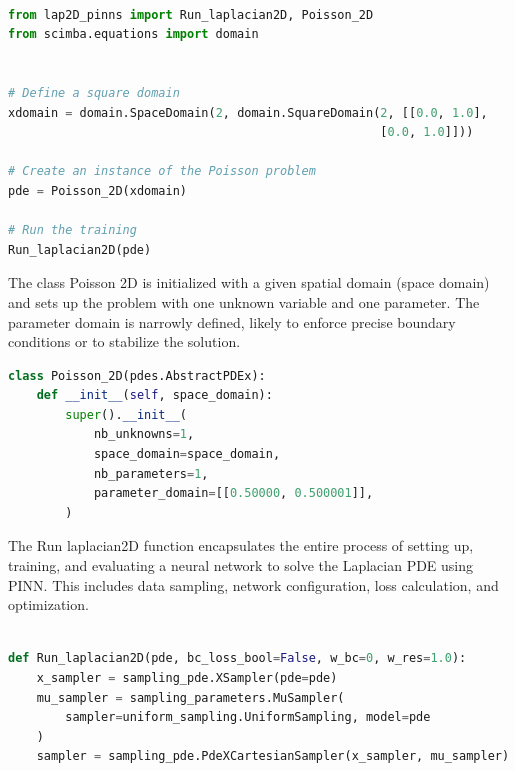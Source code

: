 \documentclass[12pt]{article}
\begin{document}
\begin{enumerate}
\begin{lstlisting}[language=Python,caption={},frame=single, backgroundcolor=\color{gray!10}, basicstyle=\footnotesize,rulecolor=\color{blue}, framexleftmargin=3pt, commentstyle=\color{mygreen}, keywordstyle=\color{blue}]

from lap2D_pinns import Run_laplacian2D, Poisson_2D
from scimba.equations import domain


# Define a square domain
xdomain = domain.SpaceDomain(2, domain.SquareDomain(2, [[0.0, 1.0], 
                                                    [0.0, 1.0]]))

# Create an instance of the Poisson problem
pde = Poisson_2D(xdomain)

# Run the training
Run_laplacian2D(pde)

\end{lstlisting}

The class Poisson 2D is initialized with a given spatial domain (space domain) and sets up the problem with one unknown variable and one parameter.
The parameter domain is narrowly defined, likely to enforce precise boundary conditions or to stabilize the solution.
\begin{lstlisting}[language=Python,caption={},frame=single, backgroundcolor=\color{gray!10}, basicstyle=\footnotesize,rulecolor=\color{blue}, framexleftmargin=3pt, commentstyle=\color{mygreen}, keywordstyle=\color{blue}]
class Poisson_2D(pdes.AbstractPDEx):
    def __init__(self, space_domain):
        super().__init__(
            nb_unknowns=1,
            space_domain=space_domain,
            nb_parameters=1,
            parameter_domain=[[0.50000, 0.500001]],
        )

\end{lstlisting}


The Run laplacian2D function encapsulates the entire process of setting up, training, and evaluating a neural network to solve the Laplacian PDE using PINN. This includes data sampling, network configuration, loss calculation, and optimization.

\begin{lstlisting}[language=Python,caption={},frame=single, backgroundcolor=\color{gray!10}, basicstyle=\footnotesize,rulecolor=\color{blue}, framexleftmargin=3pt, commentstyle=\color{mygreen}, keywordstyle=\color{blue}]

def Run_laplacian2D(pde, bc_loss_bool=False, w_bc=0, w_res=1.0):
    x_sampler = sampling_pde.XSampler(pde=pde)
    mu_sampler = sampling_parameters.MuSampler(
        sampler=uniform_sampling.UniformSampling, model=pde
    )
    sampler = sampling_pde.PdeXCartesianSampler(x_sampler, mu_sampler)


\end{lstlisting}
\end{enumerate}
\end{document}
